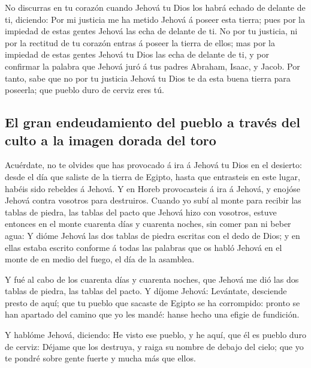  No discurras en tu corazón cuando Jehová tu Dios los
habrá echado de delante de ti, diciendo: Por mi justicia me ha metido
Jehová á poseer esta tierra; pues por la impiedad de estas gentes Jehová
las echa de delante de ti.  No por tu justicia, ni por la
rectitud de tu corazón entras á poseer la tierra de ellos; mas por la
impiedad de estas gentes Jehová tu Dios las echa de delante de ti, y por
confirmar la palabra que Jehová juró á tus padres Abraham, Isaac, y
Jacob.  Por tanto, sabe que no por tu justicia Jehová tu
Dios te da esta buena tierra para poseerla; que pueblo duro de cerviz
eres tú.

\hypertarget{el-gran-endeudamiento-del-pueblo-a-travuxe9s-del-culto-a-la-imagen-dorada-del-toro}{%
\subsection{El gran endeudamiento del pueblo a través del culto a la
imagen dorada del
toro}\label{el-gran-endeudamiento-del-pueblo-a-travuxe9s-del-culto-a-la-imagen-dorada-del-toro}}

 Acuérdate, no te olvides que has provocado á ira á Jehová
tu Dios en el desierto: desde el día que saliste de la tierra de Egipto,
hasta que entrasteis en este lugar, habéis sido rebeldes á Jehová.
 Y en Horeb provocasteis á ira á Jehová, y enojóse Jehová
contra vosotros para destruiros.  Cuando yo subí al monte
para recibir las tablas de piedra, las tablas del pacto que Jehová hizo
con vosotros, estuve entonces en el monte cuarenta días y cuarenta
noches, sin comer pan ni beber agua:  Y dióme Jehová las
dos tablas de piedra escritas con el dedo de Dios; y en ellas estaba
escrito conforme á todas las palabras que os habló Jehová en el monte de
en medio del fuego, el día de la asamblea.

 Y fué al cabo de los cuarenta días y cuarenta noches,
que Jehová me dió las dos tablas de piedra, las tablas del pacto.
 Y díjome Jehová: Levántate, desciende presto de aquí;
que tu pueblo que sacaste de Egipto se ha corrompido: pronto se han
apartado del camino que yo les mandé: hanse hecho una efigie de
fundición.

 Y hablóme Jehová, diciendo: He visto ese pueblo, y he
aquí, que él es pueblo duro de cerviz:  Déjame que los
destruya, y raiga su nombre de debajo del cielo; que yo te pondré sobre
gente fuerte y mucha más que ellos.

